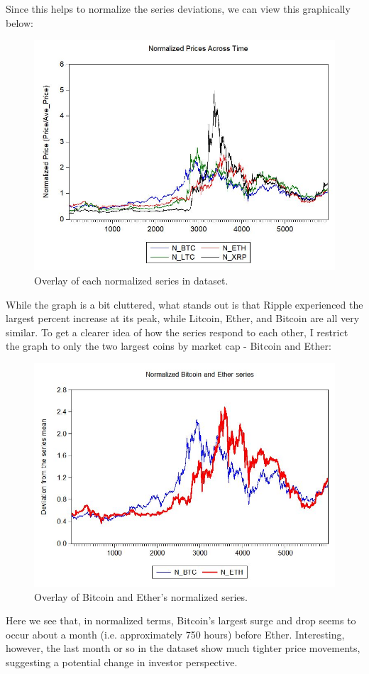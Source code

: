 \documentclass{article}
\begin{document}
	Since this helps to normalize the series deviations, we can view this graphically below: 
	\begin{figure}[H]
	\centering
	\includegraphics[width = .75\textwidth]{NormalizedPrices_graph.jpg}
	\caption{Overlay of each normalized series in dataset.}
	\end{figure}
	
	While the graph is a bit cluttered, what stands out is that Ripple experienced the largest percent increase at its peak, while Litcoin, Ether, and Bitcoin are all very similar. To get a clearer idea of how the series respond to each other, I restrict the graph to only the two largest coins by market cap - Bitcoin and Ether: 
	\begin{figure}[H]
		\centering
		\includegraphics[width = .75\textwidth]{NormalizedPrices_ethBtcGraph.jpg}
		\caption{Overlay of Bitcoin and Ether's normalized series.}
	\end{figure}
	
	Here we see that, in normalized terms, Bitcoin's largest surge and drop seems to occur about a month (i.e. approximately 750 hours) before Ether. Interesting, however, the last month or so in the dataset show much tighter price movements, suggesting a potential change in investor perspective. 
	
\end{document}
